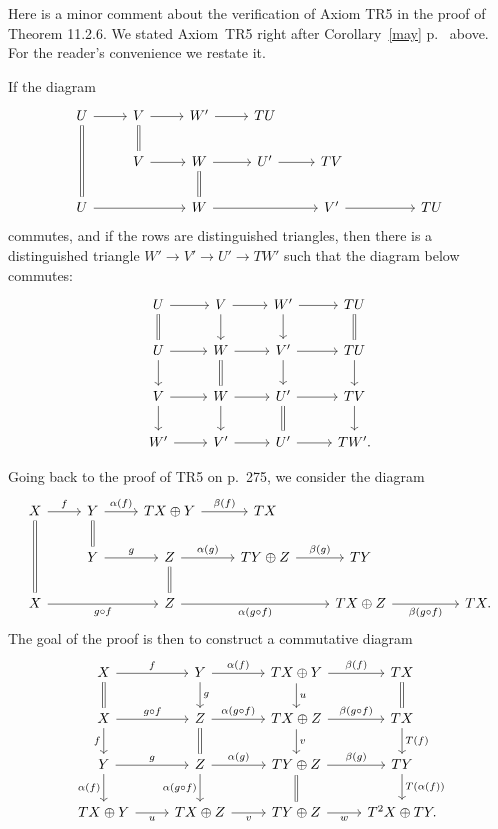\documentclass[12pt]{article}
\theoremstyle{remark}
\theoremstyle{definition}
\begin{document}
Here is a minor comment about the verification of Axiom TR5 in the proof of Theorem 11.2.6. We stated Axiom~TR5 right after Corollary~\ref{may} p.~\pageref{may} above. For the reader's convenience we restate it. 

If the diagram 
$$
\begin{tikzcd}
U\ar[equal]{dd}\ar{r}&V\ar[equal]{d}\ar{r}&W'\ar{r}&TU\\
&V\ar{r}&W\ar[equal]{d}\ar{r}&U'\ar{r}&TV\\
U\ar{rr}&&W\ar{rr}&&V'\ar{rr}&&TU
\end{tikzcd}
$$
commutes, and if the rows are distinguished triangles, then there is a distinguished triangle $W'\to V'\to U'\to TW'$ such that the diagram below commutes:
$$
\begin{tikzcd}
U\ar{r}\ar[equal]{d}&V\ar{d}\ar{r}&W'\ar{d}\ar{r}&TU\ar[equal]{d}\\
U\ar{d}\ar{r}&W\ar{r}\ar[equal]{d}&V'\ar{d}\ar{r}&TU\ar{d}\\
V\ar{d}\ar{r}&W\ar{d}\ar{r}&U'\ar{r}\ar[equal]{d}&TV\ar{d}\\
W'\ar{r}&V'\ar{r}&U'\ar{r}&TW'.
\end{tikzcd}
$$ 

Going back to the proof of TR5 on p.~275, we consider the diagram
$$
\begin{tikzcd}
X\ar[equal]{dd}\ar{r}{f}&Y\ar[equal]{d}\ar{r}{\alpha(f)}&TX\oplus Y\ar{r}{\beta(f)}&TX\\
&Y\ar{r}{g}&Z\ar[equal]{d}\ar{r}{\alpha(g)}&TY\oplus Z\ar{r}{\beta(g)}&TY\\
X\ar[swap]{rr}{g\circ f}&&Z\ar[swap]{rr}{\alpha(g\circ f)}&&TX\oplus Z\ar[swap]{rr}{\beta(g\circ f)}&&TX.
\end{tikzcd}
$$ 
The goal of the proof is then to construct a commutative diagram
$$
\begin{tikzcd}
X\ar{r}{f}\ar[equal]{d}&Y\ar{r}{\alpha(f)}\ar{d}{g}&TX\oplus Y\ar{r}{\beta(f)}\ar{d}{u}&TX\ar[equal]{d}\\ 
X\ar{r}{g\circ f}\ar{d}[swap]{f}&Z\ar{r}{\alpha(g\circ f)}\ar[equal]{d}&TX\oplus Z\ar{r}{\beta(g\circ f)}\ar{d}{v}&TX\ar{d}{T(f)}\\ 
Y\ar{r}{g}\ar{d}[swap]{\alpha(f)}&Z\ar{r}{\alpha(g)}\ar{d}[swap]{\alpha(g\circ f)}&TY\oplus Z\ar{r}{\beta(g)}\ar[equal]{d}&TY\ar{d}{T(\alpha(f))}\\ 
TX\oplus Y\ar{r}[swap]{u}&TX\oplus Z\ar{r}[swap]{v}&TY\oplus Z\ar{r}[swap]{w}&T^2X\oplus TY.
\end{tikzcd}
$$ 
\end{document}
